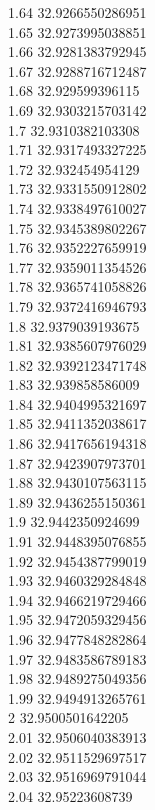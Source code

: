 {1.64	32.9266550286951\\
1.65	32.9273995038851\\
1.66	32.9281383792945\\
1.67	32.9288716712487\\
1.68	32.929599396115\\
1.69	32.9303215703142\\
1.7	32.9310382103308\\
1.71	32.9317493327225\\
1.72	32.932454954129\\
1.73	32.9331550912802\\
1.74	32.9338497610027\\
1.75	32.9345389802267\\
1.76	32.9352227659919\\
1.77	32.9359011354526\\
1.78	32.9365741058826\\
1.79	32.9372416946793\\
1.8	32.9379039193675\\
1.81	32.9385607976029\\
1.82	32.9392123471748\\
1.83	32.939858586009\\
1.84	32.9404995321697\\
1.85	32.9411352038617\\
1.86	32.9417656194318\\
1.87	32.9423907973701\\
1.88	32.9430107563115\\
1.89	32.9436255150361\\
1.9	32.9442350924699\\
1.91	32.9448395076855\\
1.92	32.9454387799019\\
1.93	32.9460329284848\\
1.94	32.9466219729466\\
1.95	32.9472059329456\\
1.96	32.9477848282864\\
1.97	32.9483586789183\\
1.98	32.9489275049356\\
1.99	32.9494913265761\\
2	32.9500501642205\\
2.01	32.9506040383913\\
2.02	32.9511529697517\\
2.03	32.9516969791044\\
2.04	32.95223608739\\
}
